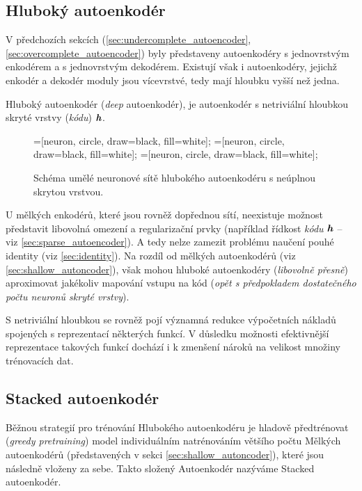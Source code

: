 \subsection{Hluboký autoenkodér}
V předchozích sekcích (\autoref{sec:undercomplete_autoencoder}, \autoref{sec:overcomplete_autoencoder}) byly představeny autoenkodéry s jednovrstvým enkodérem a s jednovrstvým dekodérem.
Existují však i autoenkodéry, jejichž enkodér a dekodér moduly jsou vícevrstvé, tedy mají hloubku vyšší než jedna.

Hluboký autoenkodér (\emph{deep} autoenkodér), je autoenkodér s netriviální hloubkou skryté vrstvy (\emph{kódu}) $\textbf{\emph{h}}$. \cite{Geron2019}

\begin{figure}[H]
    \centering
    \begin{neuralnetwork}[height=6]
        =[neuron, circle, draw=black, fill=white];
        =[neuron, circle, draw=black, fill=white];
        =[neuron, circle, draw=black, fill=white];
      
        \hiddenlayer[count=4, bias=false]
        \linklayers
        \hiddenlayer[count=2, bias=false]
        \linklayers
        \hiddenlayer[count=4, bias=false]
        \linklayers
        \outputlayer[count=6, text=\xout]
        \linklayers
      \end{neuralnetwork}
    \caption{Schéma umělé neuronové sítě hlubokého autoenkodéru s neúplnou skrytou vrstvou.}
    \label{fig:stacked_autoencoder}
\end{figure}

U mělkých enkodérů, které jsou rovněž dopřednou sítí, neexistuje možnost představit libovolná omezení a regularizační prvky (například řídkost \emph{kódu} $\textbf{\emph{h}}$ – viz \autoref{sec:sparse_autoencoder}).
A tedy nelze zamezit problému naučení pouhé identity (viz \autoref{sec:identity}). Na rozdíl od mělkých autoenkodérů (viz \autoref{sec:shallow_autoncoder}),
však mohou hluboké autoenkodéry (\emph{libovolně přesně}) aproximovat jakékoliv mapování vstupu na kód (\emph{opět s předpokladem dostatečného počtu neuronů skryté vrstvy}). \cite{Goodfellow2016, Charte2018}

S netriviální hloubkou se rovněž pojí významná redukce výpočetních nákladů spojených s reprezentací některých funkcí. 
V důsledku možnosti efektivnější reprezentace takových funkcí dochází i k zmenšení nároků na velikost množiny trénovacích dat.

\subsection{Stacked autoenkodér}
\label{sec:stacked_autoencoder}
Běžnou strategií pro trénování Hlubokého autoenkodéru je hladově předtrénovat (\emph{greedy pretraining}) model individuálním natrénováním většího počtu Mělkých autoenkodérů (představených v sekci \autoref{sec:shallow_autoncoder}), které jsou následně vloženy za sebe.
Takto složený Autoenkodér nazýváme Stacked autoenkodér. \cite{Geron2019}